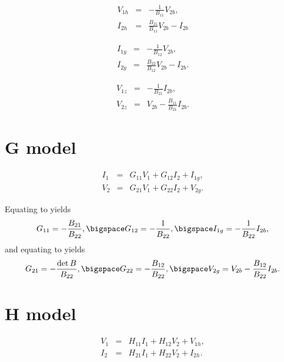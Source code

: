 \documentclass[a4paper, 12pt]{article}
\begin{document}
\begin{eqnarray}
  V_{1h} & = & -\frac{1}{B_{11}} V_{2b}, \\
  I_{2h} & = & \frac{B_{21}}{B_{11}} V_{2b} - I_{2b}
\end{eqnarray}

%
\begin{eqnarray}
  I_{1y} & = & -\frac{1}{B_{12}} V_{2b}, \\
  I_{2y} & = & \frac{B_{22}}{B_{12}} V_{2b} - I_{2b}.
\end{eqnarray}

%
\begin{eqnarray}
V_{1z} & = & -\frac{1}{B_{21}} I_{2b}, \\
V_{2z} & = & V_{2b} -\frac{B_{11}}{B_{21}} I_{2b}.
\end{eqnarray}



\section{G model}

\begin{eqnarray}
\label{eqn:GI1}
  I_1 & = & G_{11} V_1 + G_{12} I_2 + I_{1g}, \\
  V_2 & = & G_{21} V_1 + G_{22} I_2 + V_{2g}.
\label{eqn:GV2}
\end{eqnarray}


Equating  to  yields
%
\begin{equation}
 G_{11} = - \frac{B_{21}}{B_{22}}, \bigspace G_{12} = -\frac{1}{B_{22}}, \bigspace I_{1g} = -\frac{1}{B_{22}} I_{2b},
\end{equation}
%
and equating  to  yields
%
\begin{equation}
  G_{21} = -\frac{\det{B}}{B_{22}}, \bigspace G_{22} = -\frac{B_{12}}{B_{22}}, \bigspace V_{2g} = V_{2b} - \frac{B_{12}}{B_{22}} I_{2b}.
\end{equation}


\section{H model}

\begin{eqnarray}
\label{eqn:HV1}
  V_1 & = & H_{11} I_1 + H_{12} V_2 + V_{1h}, \\
  I_2 & = & H_{21} I_1 + H_{22} V_2 + I_{2h}.
\label{eqn:HI2}
\end{eqnarray}
\end{document}
